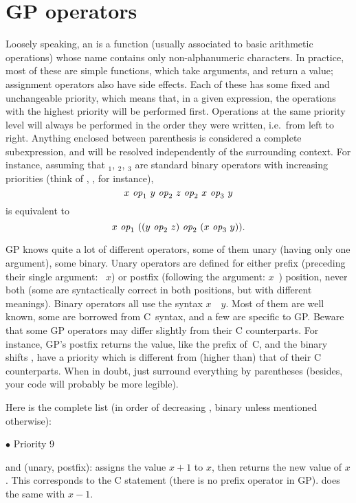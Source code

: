 \section{GP operators}\label{se:operators}

\noindent
Loosely speaking, an  is a function (usually associated to
basic arithmetic operations) whose name contains only non-alphanumeric
characters. In practice, most of these are simple functions, which take
arguments, and return a value; assignment operators also have side effects.
Each of these has some fixed and unchangeable priority, which means that,
in a given expression, the operations with the highest priority will be
performed first. Operations at the same priority level will always be
performed in the order they were written, i.e.~from left to right. Anything
enclosed between parenthesis is considered a complete subexpression, and
will be resolved independently of the surrounding context. For instance,
assuming that $_1$, $_2$, $_3$ are standard binary
operators with increasing priorities (think of \kbd{+}, \kbd{*}, \kbd{\pow}
for instance),
$$ x~\hbox{\it op\/}_1~y~\hbox{\it op\/}_2~z~\hbox{\it op\/}_2~x~\hbox{\it op\/}_3~y $$
is equivalent to
$$ x~\hbox{\it op\/}_1~((y~\hbox{\it op\/}_2~z)~\hbox{\it op\/}_2~ (x~\hbox{\it op\/}_3~y)).$$

GP knows quite a lot of different operators, some of them unary (having
only one argument), some binary. Unary operators are defined for either
prefix (preceding their single argument: ~$x$) or postfix (following
the argument: $x$~) position, never both
(some are syntactically correct in both positions, but with different
meanings). Binary operators all use the syntax $x$~~$y$. Most of
them are well known, some are borrowed from C~syntax, and a few are specific
to GP. Beware that some GP operators may differ slightly from their C
counterparts. For instance, GP's postfix \kbd{++} returns the 
value, like the prefix \kbd{++} of~C, and the binary shifts \kbd{<<},
\kbd{>>} have a priority which is different from (higher than) that of
their C counterparts.
When in doubt, just surround everything by parentheses (besides, your code
will probably be more legible).

\noindent Here is the complete list (in order of decreasing ,
binary unless mentioned otherwise):

\def\point#1{\noindent $\bullet$ #1\hfill\break\indent\strut}
\point{Priority 9}
%
\kbd{++} and \kbd{--} (unary, postfix):  assigns the value $x+1$ to
$x$, then returns the new value of $x$. This corresponds to the C
statement  (there is no prefix \kbd{++} operator in GP).
 does the same with $x-1$.

